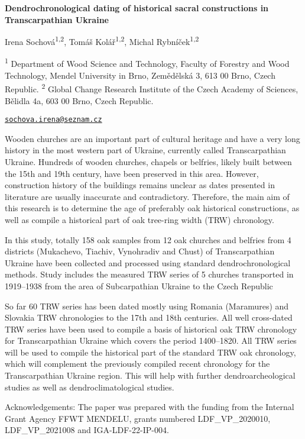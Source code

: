 \documentclass[
]{book}
\begin{document}
\textbf{Dendrochronological dating of historical sacral constructions in Transcarpathian Ukraine}

Irena Sochová\textsuperscript{1,2}, Tomáš Kolář\textsuperscript{1,2}, Michal Rybníček\textsuperscript{1,2}

\textsuperscript{1} Department of Wood Science and Technology, Faculty of Forestry and Wood Technology, Mendel University in Brno, Zemědělská 3, 613 00 Brno, Czech Republic. \textsuperscript{2} Global Change Research Institute of the Czech Academy of Sciences, Bělidla 4a, 603 00 Brno, Czech Republic.

\href{mailto:sochova.irena@seznam.cz}{\nolinkurl{sochova.irena@seznam.cz}}

Wooden churches are an important part of cultural heritage and have a very long history in the most western part of Ukraine, currently called Transcarpathian Ukraine. Hundreds of wooden churches, chapels or belfries, likely built between the 15th and 19th century, have been preserved in this area. However, construction history of the buildings remains unclear as dates presented in literature are usually inaccurate and contradictory. Therefore, the main aim of this research is to determine the age of preferably oak historical constructions, as well as compile a historical part of oak tree-ring width (TRW) chronology.

In this study, totally 158 oak samples from 12 oak churches and belfries from 4 districts (Mukachevo, Tiachiv, Vynohradiv and Chust) of Transcarpathian Ukraine have been collected and processed using standard dendrochronological methods. Study includes the measured TRW series of 5 churches transported in 1919--1938 from the area of Subcarpathian Ukraine to the Czech Republic

So far 60 TRW series has been dated mostly using Romania (Maramures) and Slovakia TRW chronologies to the 17th and 18th centuries. All well cross-dated TRW series have been used to compile a basis of historical oak TRW chronology for Transcarpathian Ukraine which covers the period 1400--1820. All TRW series will be used to compile the historical part of the standard TRW oak chronology, which will complement the previously compiled recent chronology for the Transcarpathian Ukraine region. This will help with further dendroarcheological studies as well as dendroclimatological studies.

Acknowledgements: The paper was prepared with the funding from the Internal Grant Agency FFWT MENDELU, grants numbered LDF\_VP\_2020010, LDF\_VP\_2021008 and IGA-LDF-22-IP-004.
\end{document}
